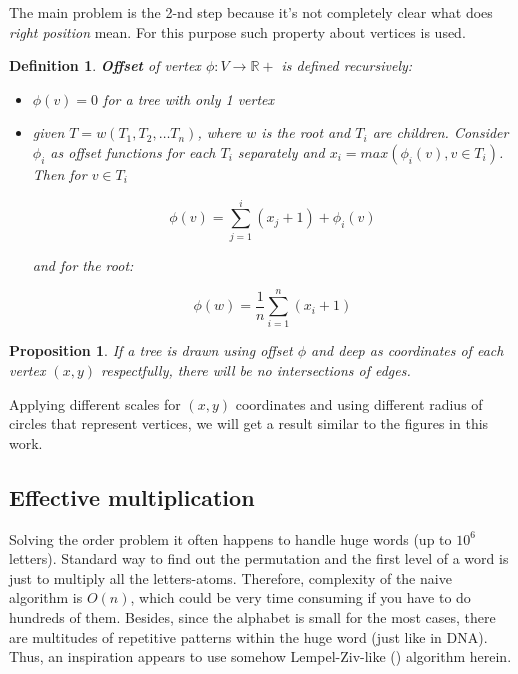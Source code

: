 \documentclass[a4paper,12pt]{amsart}
\newtheorem{definition}{Definition}
\newtheorem{proposition}{Proposition}
\begin{document}
The main problem is the 2-nd step because it's not completely clear what does \textit{right position} mean. For this purpose such property about vertices is used. 

\begin{definition}
	\textbf{Offset} of vertex $\phi : V \rightarrow \mathbb{R}+$ is defined recursively:
	
	\begin{itemize}
		\item $\phi(v) = 0$ for a tree with only 1 vertex
		
		\item given $T = w (T_1, T_2, \dots T_n)$, where $w$ is the root and $T_i$ are children. Consider $\phi_i$ as offset functions for each $T_i$ separately and $x_i = max({\phi_i(v), v \in T_i})$. Then for $v \in T_i$ 
		
		$$\phi(v) = \sum_{j = 1}^{i} (x_j + 1) + \phi_i(v)$$
		
		and for the root: 
		
		$$\phi(w) = \frac{1}{n} \sum_{i=1}^{n} (x_i + 1)$$
	\end{itemize}
\end{definition}


\begin{proposition}
	If a tree is drawn using offset $\phi$ and deep as coordinates of each vertex $(x, y)$ respectfully, there will be no intersections of edges.
\end{proposition}

Applying different scales for $(x, y)$ coordinates and using different radius of circles that represent vertices, we will get a result similar to the figures in this work.

\subsection{Effective multiplication}

Solving the order problem it often happens to handle huge words (up to $10^6$ letters). Standard way to find out the permutation and the first level of a word is just to multiply all the letters-atoms. Therefore, complexity of the naive algorithm is $O(n)$, which could be very time consuming if you have to do hundreds of them. Besides, since the alphabet is small for the most cases, there are multitudes of repetitive patterns within the huge word (just like in DNA). Thus, an inspiration appears to use somehow Lempel-Ziv-like (\cite{Lempel-Ziv}) algorithm herein.   
\end{document}
